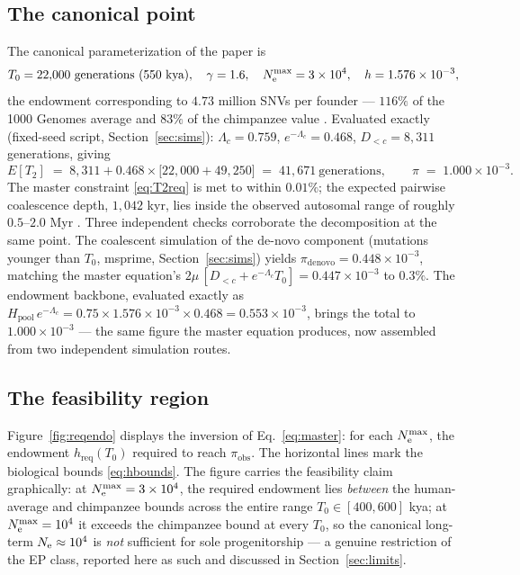 \subsection{The canonical point}\label{sec:canonical}
The canonical parameterization of the paper is
\begin{equation}\label{eq:canonical}
T_0 = 22{,}000\ \text{generations}\ (550\ \text{kya}), \quad
\gamma = 1.6, \quad
N_{\mathrm{e}}^{\max} = 3\times10^{4}, \quad
h = 1.576\times10^{-3},
\end{equation}
the endowment corresponding to $4.73$ million SNVs per founder --- $116\%$
of the 1000 Genomes average and $83\%$ of the chimpanzee value
\citep{PradoMartinez2013,Auton2015}. Evaluated exactly (fixed-seed script,
Section~\ref{sec:sims}): $\Lambda_c = 0.759$,
$e^{-\Lambda_c} = 0.468$, $D_{<c} = 8{,}311$ generations, giving
\begin{equation}\label{eq:canonval}
E[T_2] \;=\; 8{,}311 + 0.468\times\bigl[22{,}000 + 49{,}250\bigr]
\;=\; 41{,}671\ \text{generations},
\qquad
\pi \;=\; 1.000\times10^{-3}.
\end{equation}
The master constraint \eqref{eq:T2req} is met to within $0.01\%$; the
expected pairwise coalescence depth, $1{,}042$ kyr, lies inside the
observed autosomal range of roughly $0.5$--$2.0$ Myr
\citep{GarriganHammer2005,LiDurbin2011}. Three independent checks
corroborate the decomposition at the same point. The coalescent simulation
of the de-novo component (mutations younger than $T_0$, msprime,
Section~\ref{sec:sims}) yields $\pi_{\mathrm{denovo}} = 0.448\times10^{-3}$,
matching the master equation's $2\mu\,[D_{<c} + e^{-\Lambda_c}T_0] =
0.447\times10^{-3}$ to $0.3\%$. The endowment backbone, evaluated exactly
as $H_{\mathrm{pool}}\,e^{-\Lambda_c} = 0.75 \times 1.576\times10^{-3}
\times 0.468 = 0.553\times10^{-3}$, brings the total to
$1.000\times10^{-3}$ --- the same figure the master equation produces,
now assembled from two independent simulation routes.

\subsection{The feasibility region}\label{sec:feasregion}
Figure~\ref{fig:reqendo} displays the inversion of Eq.~\eqref{eq:master}:
for each $N_{\mathrm{e}}^{\max}$, the endowment $h_{\mathrm{req}}(T_0)$ required to
reach $\pi_{\mathrm{obs}}$. The horizontal lines mark the biological
bounds \eqref{eq:hbounds}. The figure carries the feasibility claim
graphically: at $N_{\mathrm{e}}^{\max} = 3\times10^{4}$, the required endowment lies
\emph{between} the human-average and chimpanzee bounds across the entire
range $T_0 \in [400, 600]$ kya; at $N_{\mathrm{e}}^{\max} = 10^{4}$ it exceeds the
chimpanzee bound at every $T_0$, so the canonical long-term
$N_{\mathrm{e}} \approx 10^{4}$ is \emph{not} sufficient for sole progenitorship ---
a genuine restriction of the EP class, reported here as such and discussed
in Section~\ref{sec:limits}.


